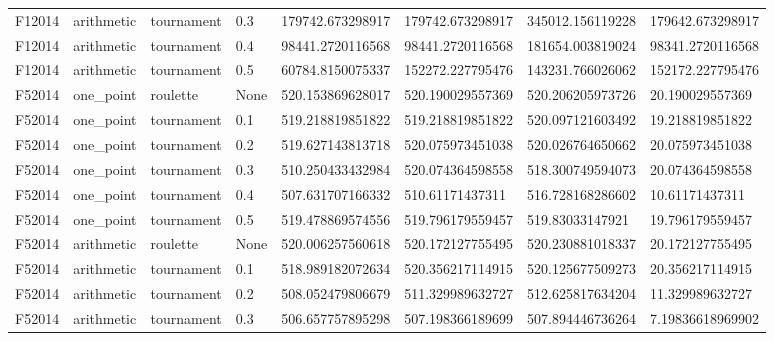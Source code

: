 \begin{table}[!ht]
{\begin{tabular}{llllllll}
            F12014                                     & arithmetic & tournament & 0.3  & 179742.673298917 & 179742.673298917 & 345012.156119228 & 179642.673298917 \\
            F12014                                     & arithmetic & tournament & 0.4  & 98441.2720116568 & 98441.2720116568 & 181654.003819024 & 98341.2720116568 \\
            F12014                                     & arithmetic & tournament & 0.5  & 60784.8150075337 & 152272.227795476 & 143231.766026062 & 152172.227795476 \\
            F52014                                     & one\_point & roulette   & None & 520.153869628017 & 520.190029557369 & 520.206205973726 & 20.190029557369  \\
            F52014                                     & one\_point & tournament & 0.1  & 519.218819851822 & 519.218819851822 & 520.097121603492 & 19.218819851822  \\
            F52014                                     & one\_point & tournament & 0.2  & 519.627143813718 & 520.075973451038 & 520.026764650662 & 20.075973451038  \\
            F52014                                     & one\_point & tournament & 0.3  & 510.250433432984 & 520.074364598558 & 518.300749594073 & 20.074364598558  \\
            F52014                                     & one\_point & tournament & 0.4  & 507.631707166332 & 510.61171437311  & 516.728168286602 & 10.61171437311   \\
            F52014                                     & one\_point & tournament & 0.5  & 519.478869574556 & 519.796179559457 & 519.83033147921  & 19.796179559457  \\
            F52014                                     & arithmetic & roulette   & None & 520.006257560618 & 520.172127755495 & 520.230881018337 & 20.172127755495  \\
            F52014                                     & arithmetic & tournament & 0.1  & 518.989182072634 & 520.356217114915 & 520.125677509273 & 20.356217114915  \\
            F52014                                     & arithmetic & tournament & 0.2  & 508.052479806679 & 511.329989632727 & 512.625817634204 & 11.329989632727  \\
            F52014                                     & arithmetic & tournament & 0.3  & 506.657757895298 & 507.198366189699 & 507.894446736264 & 7.19836618969902 \\

\end{tabular}}
\end{table}
